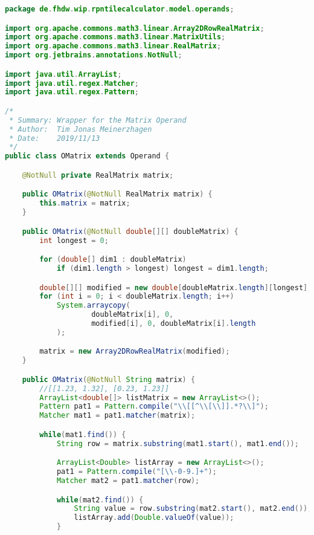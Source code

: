 \begin{lstlisting}[caption=OMatrix (Meinerzhagen),label=list:OMatrix,language=Java]
package de.fhdw.wip.rpntilecalculator.model.operands;

import org.apache.commons.math3.linear.Array2DRowRealMatrix;
import org.apache.commons.math3.linear.MatrixUtils;
import org.apache.commons.math3.linear.RealMatrix;
import org.jetbrains.annotations.NotNull;

import java.util.ArrayList;
import java.util.regex.Matcher;
import java.util.regex.Pattern;

/*
 * Summary: Wrapper for the Matrix Operand
 * Author:  Tim Jonas Meinerzhagen
 * Date:    2019/11/13
 */
public class OMatrix extends Operand {

    @NotNull private RealMatrix matrix;

    public OMatrix(@NotNull RealMatrix matrix) {
        this.matrix = matrix;
    }

    public OMatrix(@NotNull double[][] doubleMatrix) {
        int longest = 0;

        for (double[] dim1 : doubleMatrix)
            if (dim1.length > longest) longest = dim1.length;

        double[][] modified = new double[doubleMatrix.length][longest];
        for (int i = 0; i < doubleMatrix.length; i++)
            System.arraycopy(
                    doubleMatrix[i], 0,
                    modified[i], 0, doubleMatrix[i].length
            );

        matrix = new Array2DRowRealMatrix(modified);
    }

    public OMatrix(@NotNull String matrix) {
        //[[1.23, 1.32], [0.23, 1.23]]
        ArrayList<double[]> listMatrix = new ArrayList<>();
        Pattern pat1 = Pattern.compile("\\[[^\\[\\]].*?\\]");
        Matcher mat1 = pat1.matcher(matrix);

        while(mat1.find()) {
            String row = matrix.substring(mat1.start(), mat1.end());

            ArrayList<Double> listArray = new ArrayList<>();
            pat1 = Pattern.compile("[\\-0-9.]+");
            Matcher mat2 = pat1.matcher(row);

            while(mat2.find()) {
                String value = row.substring(mat2.start(), mat2.end());
                listArray.add(Double.valueOf(value));
            }


\end{lstlisting}
